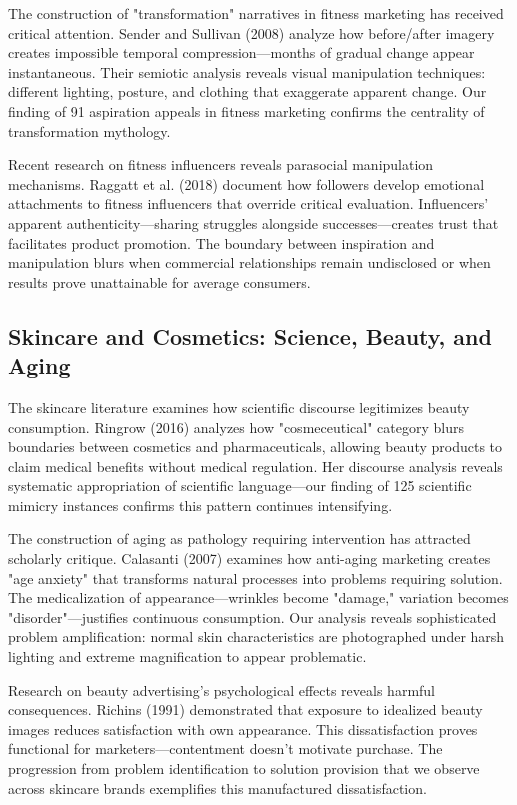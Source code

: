 The construction of "transformation" narratives in fitness marketing has received critical attention. Sender and Sullivan (2008) analyze how before/after imagery creates impossible temporal compression—months of gradual change appear instantaneous. Their semiotic analysis reveals visual manipulation techniques: different lighting, posture, and clothing that exaggerate apparent change. Our finding of 91 aspiration appeals in fitness marketing confirms the centrality of transformation mythology.

Recent research on fitness influencers reveals parasocial manipulation mechanisms. Raggatt et al. (2018) document how followers develop emotional attachments to fitness influencers that override critical evaluation. Influencers' apparent authenticity—sharing struggles alongside successes—creates trust that facilitates product promotion. The boundary between inspiration and manipulation blurs when commercial relationships remain undisclosed or when results prove unattainable for average consumers.

\subsection{Skincare and Cosmetics: Science, Beauty, and Aging}

The skincare literature examines how scientific discourse legitimizes beauty consumption. Ringrow (2016) analyzes how "cosmeceutical" category blurs boundaries between cosmetics and pharmaceuticals, allowing beauty products to claim medical benefits without medical regulation. Her discourse analysis reveals systematic appropriation of scientific language—our finding of 125 scientific mimicry instances confirms this pattern continues intensifying.

The construction of aging as pathology requiring intervention has attracted scholarly critique. Calasanti (2007) examines how anti-aging marketing creates "age anxiety" that transforms natural processes into problems requiring solution. The medicalization of appearance—wrinkles become "damage," variation becomes "disorder"—justifies continuous consumption. Our analysis reveals sophisticated problem amplification: normal skin characteristics are photographed under harsh lighting and extreme magnification to appear problematic.

Research on beauty advertising's psychological effects reveals harmful consequences. Richins (1991) demonstrated that exposure to idealized beauty images reduces satisfaction with own appearance. This dissatisfaction proves functional for marketers—contentment doesn't motivate purchase. The progression from problem identification to solution provision that we observe across skincare brands exemplifies this manufactured dissatisfaction.

